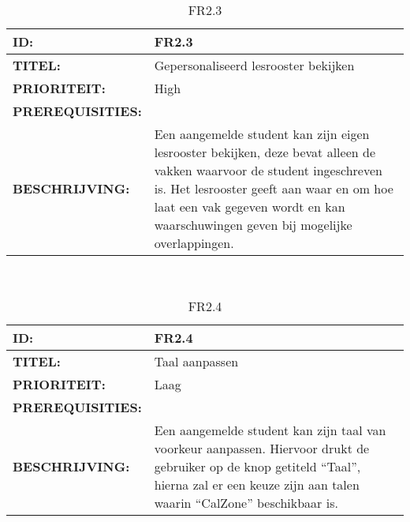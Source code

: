 
\noindent\begin{table}[H]
            \begin{tabular}{l | p{10cm}}
                \textbf{ID:} & FR2.3 \\ \hline
                \textbf{TITEL:} & Gepersonaliseerd lesrooster bekijken\\ \hline
                \textbf{PRIORITEIT:} &  High \\ \hline
                \textbf{PREREQUISITIES:} & \\ \hline
                \textbf{BESCHRIJVING:} & Een aangemelde student kan zijn eigen lesrooster bekijken, deze bevat alleen de vakken waarvoor de student ingeschreven is. 
                                        Het lesrooster geeft aan waar en om hoe laat een vak gegeven wordt en kan waarschuwingen geven bij mogelijke overlappingen.\\ 
            \end{tabular}\\
            \caption{FR2.3}
            \label{tab:FR2.3}
        \end{table}


\noindent\begin{table}[H]
            \begin{tabular}{l | p{10cm}}
                \textbf{ID:} & FR2.4 \\ \hline
                \textbf{TITEL:} & Taal aanpassen\\ \hline
                \textbf{PRIORITEIT:} &  Laag \\ \hline
                \textbf{PREREQUISITIES:} & \\ \hline
                \textbf{BESCHRIJVING:} & Een aangemelde student kan zijn taal van voorkeur aanpassen. 
                                        Hiervoor drukt de gebruiker op de knop getiteld “Taal”, hierna zal er een keuze zijn aan talen waarin “CalZone” beschikbaar is.\\ 
            \end{tabular}\\
            \caption{FR2.4}
            \label{tab:FR2.4}
        \end{table}


